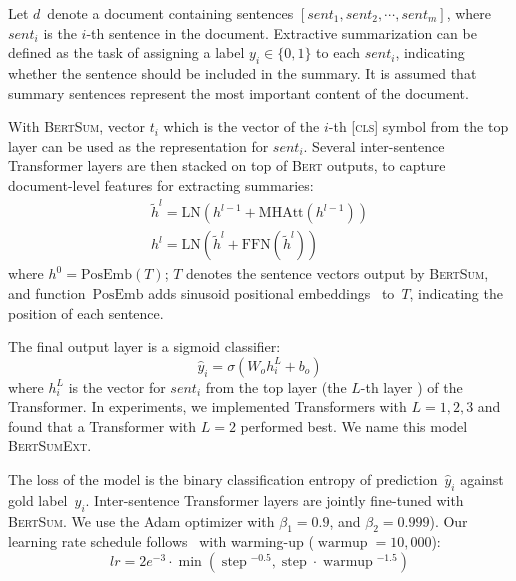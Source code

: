 \documentclass[11pt,a4paper]{article}
\DeclareMathOperator\step{\operatorname{step}}
\DeclareMathOperator\warmup{\operatorname{warmup}}
\begin{document}
    Let $d$~denote a document containing sentences $[sent_1, sent_2,
    \cdots, sent_m]$, where $sent_i$ is the $i$-th sentence in the
    document.  Extractive summarization can be defined as the task of
    assigning a label $y_i \in \{0, 1\}$ to each $sent_i$, indicating
    whether the sentence should be included in the summary. It is assumed
    that summary sentences represent the most important content of the
    document.
    
    With \textsc{BertSum}, vector $t_i$ which is the vector of the $i$-th
    [\textsc{cls}] symbol from the top layer can be used as the
    representation for $sent_i$.  Several inter-sentence Transformer
    layers are then stacked on top of \textsc{Bert} outputs, to capture
    document-level features for extracting summaries:
    \begin{gather}
    \tilde{h}^l=\mathrm{LN}(h^{l-1}+\mathrm{MHAtt}(h^{l-1}))\\
    h^l=\mathrm{LN}(\tilde{h}^l+\mathrm{FFN}(\tilde{h}^l))
    \end{gather}
    where $h^0=\mathrm{PosEmb}(T)$; $T$ denotes the sentence vectors
    output by \textsc{BertSum}, and function~$\mathrm{PosEmb}$ adds
    sinusoid positional embeddings~\cite{vaswani2017attention} to~$T$,
    indicating the position of each sentence.
    
    The final output layer is a sigmoid classifier:
    \begin{equation}
    \hat{y}_i = \sigma(W_oh_i^L+b_o)
    \end{equation}
    where $h^L_i$ is the vector for $sent_i$ from the top layer (the
    $L$-th layer ) of the Transformer. In experiments, we implemented
    Transformers with $L=1, 2, 3$ and found that a Transformer with
    $L=2$ performed best.
    We name this model \textsc{BertSumExt}.
    
    The loss of the model is the binary classification entropy of
    prediction~$\hat{y}_i$ against gold label~$y_i$.  Inter-sentence
    Transformer layers are jointly fine-tuned with \textsc{BertSum}.
    We use the Adam optimizer with $\beta_1=0.9$, and
    $\beta_2=0.999$). Our learning rate schedule
    follows~\cite{vaswani2017attention} with warming-up ($ \warmup=10,000$):
    \begin{equation}
    \nonumber lr = 2e^{-3}\cdot \min{}(\step{}^{-0.5}, \step{} \cdot \warmup{}^{-1.5})
    \end{equation}
    
\end{document}
